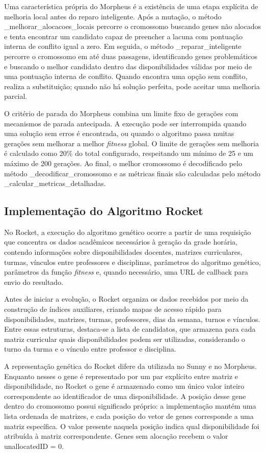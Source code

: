Uma característica própria do Morpheus é a existência de uma etapa explícita de melhoria local antes do reparo inteligente. Após a mutação, o método \_melhorar\_alocacoes\_locais percorre o cromossomo buscando genes não alocados e tenta encontrar um candidato capaz de preencher a lacuna com pontuação interna de conflito igual a zero. Em seguida, o método \_reparar\_inteligente percorre o cromossomo em até duas passagens, identificando genes problemáticos e buscando o melhor candidato dentro das disponibilidades válidas por meio de uma pontuação interna de conflito. Quando encontra uma opção sem conflito, realiza a substituição; quando não há solução perfeita, pode aceitar uma melhoria parcial.

O critério de parada do Morpheus combina um limite fixo de gerações com mecanismos de parada antecipada. A execução pode ser interrompida quando uma solução sem erros é encontrada, ou quando o algoritmo passa muitas gerações sem melhorar a melhor \textit{fitness} global. O limite de gerações sem melhoria é calculado como 20\% do total configurado, respeitando um mínimo de 25 e um máximo de 200 gerações. Ao final, o melhor cromossomo é decodificado pelo método \_decodificar\_cromossomo e as métricas finais são calculadas pelo método \_calcular\_metricas\_detalhadas.

\subsection{Implementação do Algoritmo Rocket}
\label{sec:7.3}

No Rocket, a execução do algoritmo genético ocorre a partir de uma requisição que concentra os dados acadêmicos necessários à geração da grade horária, contendo informações sobre disponibilidades docentes, matrizes curriculares, turmas, vínculos entre professores e disciplinas, parâmetros do algoritmo genético, parâmetros da função \textit{fitness} e, quando necessário, uma URL de callback para envio do resultado.

Antes de iniciar a evolução, o Rocket organiza os dados recebidos por meio da construção de índices auxiliares, criando mapas de acesso rápido para disponibilidades, matrizes, turmas, professores, dias da semana, turnos e vínculos. Entre essas estruturas, destaca-se a lista de candidatos, que armazena para cada matriz curricular quais disponibilidades podem ser utilizadas, considerando o turno da turma e o vínculo entre professor e disciplina.

A representação genética do Rocket difere da utilizada no Sunny e no Morpheus. Enquanto nesses o gene é representado por um par explícito entre matriz e disponibilidade, no Rocket o gene é armazenado como um único valor inteiro correspondente ao identificador de uma disponibilidade. A posição desse gene dentro do cromossomo possui significado próprio: a implementação mantém uma lista ordenada de matrizes, e cada posição do vetor de genes corresponde a uma matriz específica. O valor presente naquela posição indica qual disponibilidade foi atribuída à matriz correspondente. Genes sem alocação recebem o valor unallocatedID = 0.

